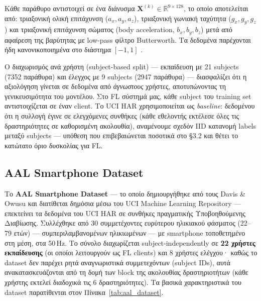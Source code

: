 Κάθε παράθυρο αντιστοιχεί σε ένα διάνυσμα
$\mathbf{X}^{(k)} \in \mathbb{R}^{9 \times 128}$, το οποίο
αποτελείται από: τριαξονική ολική επιτάχυνση ($a_x, a_y, a_z$),
τριαξονική γωνιακή ταχύτητα ($g_x, g_y, g_z$) και τριαξονική
επιτάχυνση σώματος (body acceleration, $b_x, b_y, b_z$) μετά
από αφαίρεση της βαρύτητας με low-pass φίλτρο Butterworth.
Τα δεδομένα παρέχονται ήδη κανονικοποιημένα στο διάστημα
$[-1, 1]$ \cite{Anguita2013}.

Ο διαχωρισμός ανά χρήστη (subject-based split) — εκπαίδευση με
21 subjects (7352 παράθυρα) και έλεγχος με 9 subjects (2947 παράθυρα) —
διασφαλίζει ότι η αξιολόγηση γίνεται σε δεδομένα από
\textit{άγνωστους} χρήστες, αποτυπώνοντας τη γενικευσιμότητα του
μοντέλου. Στο FL σύστημά μας, κάθε subject του training set
αντιστοιχίζεται σε έναν client. Το UCI HAR χρησιμοποιείται ως
\textit{baseline}: δεδομένου ότι η συλλογή έγινε σε ελεγχόμενες
συνθήκες (κάθε εθελοντής εκτέλεσε όλες τις δραστηριότητες σε
καθορισμένη ακολουθία), αναμένουμε σχεδόν IID κατανομή labels
μεταξύ subjects — υπόθεση που επιβεβαιώνεται ποσοτικά στο §3.2
και θέτει το κατώτατο όριο δυσκολίας για FL.

\subsection{AAL Smartphone Dataset}
\label{subsec:aal_dataset}

Το \textbf{AAL Smartphone Dataset} --- το οποίο δημιουργήθηκε από
τους Davis \& Owusu \cite{DavisOwusu2016} και διατίθεται δημόσια μέσω του UCI Machine Learning Repository
\cite{AAL_UCI2016} --- επεκτείνει τα δεδομένα του UCI HAR σε συνθήκες
πραγματικής Υποβοηθούμενης Διαβίωσης. Συλλέχθηκε από 30 συμμετέχοντες
ευρύτερου ηλικιακού φάσματος (22–79 ετών) — συμπεριλαμβανομένων
ηλικιωμένων — με smartphone τοποθετημένο στη μέση, στα 50\,Hz.
Το σύνολο διαχωρίζεται subject-independently σε \textbf{22 χρήστες εκπαίδευσης}
(οι οποίοι λειτουργούν ως FL clients) και 8 χρήστες ελέγχου· καθώς το dataset
δεν παρέχει ρητά αναγνωριστικά συμμετεχόντων (subject IDs), αυτά ανακατασκευάζονται
από τη δομή των block της ακολουθίας δραστηριοτήτων (κάθε χρήστης εκτελεί διαδοχικά
τις 6 δραστηριότητες).
Τα βασικά χαρακτηριστικά του dataset παρατίθενται στον Πίνακα~\ref{tab:aal_dataset}.


